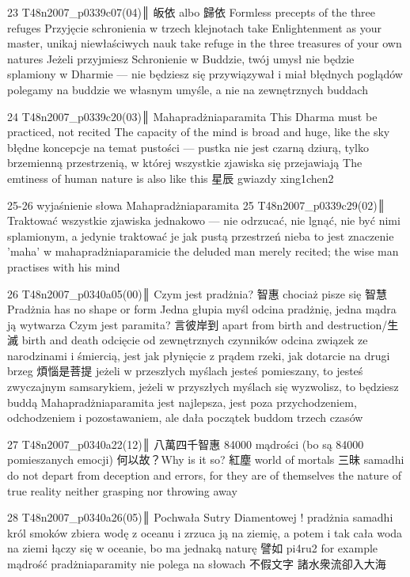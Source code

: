 23 T48n2007_p0339c07(04)║
皈依 albo 歸依
Formless precepts of the three refuges
Przyjęcie schronienia w trzech klejnotach
take Enlightenment as your master, unikaj niewłaściwych nauk
take refuge in the three treasures of your own natures
Jeżeli przyjmiesz Schronienie w Buddzie, twój umysł nie będzie splamiony
w Dharmie --- nie będziesz się przywiązywał i miał błędnych poglądów
polegamy na buddzie we własnym umyśle, a nie na zewnętrznych buddach

24 T48n2007_p0339c20(03)║
Mahapradżniaparamita
This Dharma must be practiced, not recited
The capacity of the mind is broad and huge, like the sky
błędne koncepcje na temat pustości --- pustka nie jest czarną dziurą, tylko brzemienną przestrzenią, w której wszystkie zjawiska się przejawiają
The emtiness of human nature is also like this
星辰 gwiazdy xing1chen2

25-26 wyjaśnienie słowa Mahapradżniaparamita
25 T48n2007_p0339c29(02)║
Traktować wszystkie zjawiska jednakowo --- nie odrzucać, nie lgnąć, nie być nimi splamionym, a jedynie traktować je jak pustą przestrzeń nieba
to jest znaczenie 'maha' w mahapradżniaparamicie
the deluded man merely recited; the wise man practises with his mind

26 T48n2007_p0340a05(00)║
Czym jest pradżnia? 智惠 chociaż pisze się 智慧
Pradżnia has no shape or form
Jedna głupia myśl odcina pradżnię, jedna mądra ją wytwarza
Czym jest paramita? 言彼岸到
apart from birth and destruction/生滅 birth and death
odcięcie od zewnętrznych czynników odcina związek ze narodzinami i śmiercią, jest jak płynięcie z prądem rzeki, jak dotarcie na drugi brzeg
煩惱是菩提
jeżeli w przeszłych myślach jesteś pomieszany, to jesteś zwyczajnym samsarykiem, jeżeli w przyszłych myślach się wyzwolisz, to będziesz buddą
Mahapradżniaparamita jest najlepsza, jest poza przychodzeniem, odchodzeniem i pozostawaniem, ale dała początek buddom trzech czasów

27 T48n2007_p0340a22(12)║
八萬四千智惠 84000 mądrości (bo są 84000 pomieszanych emocji)
何以故？Why is it so?
紅塵 world of mortals
三昧 samadhi
do not depart from deception and errors, for they are of themselves the nature of true reality
neither grasping nor throwing away

28 T48n2007_p0340a26(05)║
Pochwała Sutry Diamentowej !
pradżnia samadhi
król smoków zbiera wodę z oceanu i zrzuca ją na ziemię, a potem i tak cała woda na ziemi łączy się w oceanie, bo ma jednaką naturę
譬如 pi4ru2 for example
mądrość pradżniaparamity nie polega na słowach 不假文字
諸水衆流卻入大海

